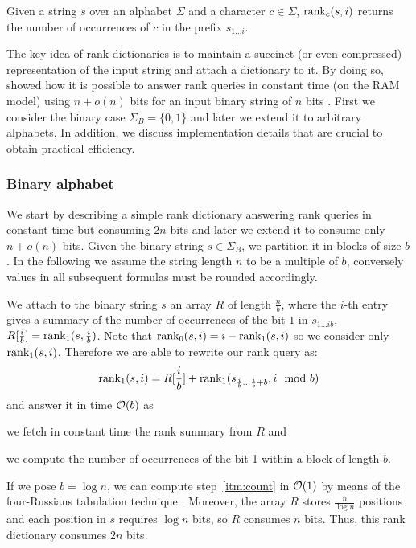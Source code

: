 \begin{definition}
Given a string $s$ over an alphabet $\Sigma$ and a character $c \in \Sigma$, $\text{rank}_c(s, i)$ returns the number of occurrences of $c$ in the prefix $s_{1 \dots i}$.
\end{definition}

The key idea of rank dictionaries is to maintain a succinct (or even compressed) representation of the input string and attach a dictionary to it.
By doing so, \citeauthor{Jacobson1989} showed how it is possible to answer rank queries in constant time (on the RAM model) using $n+o(n)$ bits for an input binary string of $n$ bits \citep{Jacobson1989}.
First we consider the binary case $\Sigma_B = \{ 0, 1 \}$ and later we extend it to arbitrary alphabets.
In addition, we discuss implementation details that are crucial to obtain practical efficiency.

\subsubsection{Binary alphabet}

We start by describing a simple rank dictionary answering rank queries in constant time but consuming $2n$ bits and later we extend it to consume only $n + o(n)$ bits.
Given the binary string $s \in \Sigma_B$, we partition it in blocks of size $b$.
In the following we assume \wlogs the string length $n$ to be a multiple of $b$, conversely values in all subsequent formulas must be rounded accordingly.

We attach to the binary string $s$ an array $R$ of length $\frac{n}{b}$, where the $i$-th entry gives a summary of the number of occurrences of the bit $1$ in $s_{1 \dots i b}$, \ie $R[\frac{i}{b}] = \text{rank}_1(s, \frac{i}{b})$.
Note that $\text{rank}_0(s, i) = i - \text{rank}_1(s, i)$ so we consider only $\text{rank}_1(s, i)$.
Therefore we are able to rewrite our rank query as:
\begin{eqnarray}
\text{rank}_1(s,i) = R[\frac{i}{b}] + \text{rank}_1(s_{\frac{i}{b} \dots \frac{i}{b}+b}, i \mod{b})
\end{eqnarray}
and answer it in time $\mathcal{O}(b)$ as 
\begin{inparaenum}[(i)]
\item \label{itm:fetch} we fetch in constant time the rank summary from $R$ and
\item \label{itm:count} we compute the number of occurrences of the bit 1 within a block of length $b$.
\end{inparaenum}
If we pose $b=\log{n}$, we can compute step~\ref{itm:count} in $\mathcal{O}(1)$ by means of the four-Russians tabulation technique \citep{Arlazarov1975}.
Moreover, the array $R$ stores $\frac{n}{\log{n}}$ positions and each position in $s$ requires $\log{n}$ bits, so $R$ consumes $n$ bits.
Thus, this rank dictionary consumes $2n$ bits.

